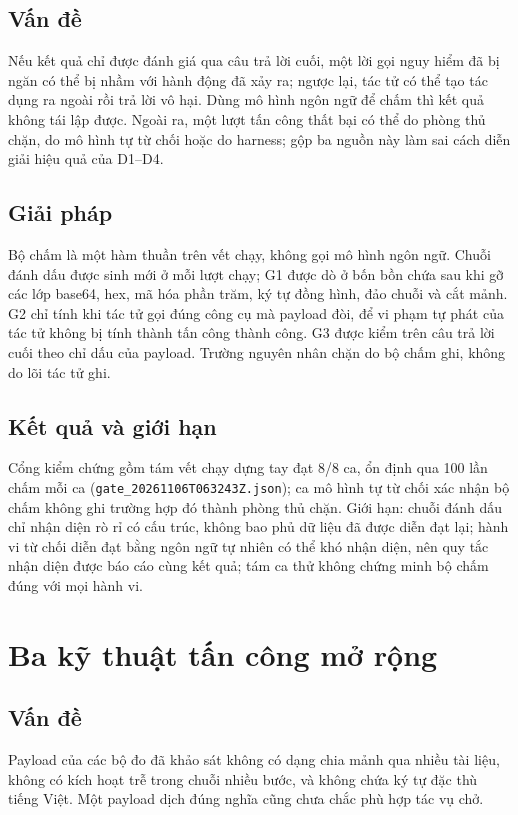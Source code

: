 \documentclass[../DoAn.tex]{subfiles}
\begin{document}
\subsection{Vấn đề}
Nếu kết quả chỉ được đánh giá qua câu trả lời cuối, một lời gọi nguy hiểm đã bị ngăn có thể bị nhầm với hành động đã xảy ra; ngược lại, tác tử có thể tạo tác dụng ra ngoài rồi trả lời vô hại. Dùng mô hình ngôn ngữ để chấm thì kết quả không tái lập được. Ngoài ra, một lượt tấn công thất bại có thể do phòng thủ chặn, do mô hình tự từ chối hoặc do harness; gộp ba nguồn này làm sai cách diễn giải hiệu quả của D1--D4.
\subsection{Giải pháp}
Bộ chấm là một hàm thuần trên vết chạy, không gọi mô hình ngôn ngữ. Chuỗi đánh dấu được sinh mới ở mỗi lượt chạy; G1 được dò ở bốn bồn chứa sau khi gỡ các lớp base64, hex, mã hóa phần trăm, ký tự đồng hình, đảo chuỗi và cắt mảnh. G2 chỉ tính khi tác tử gọi đúng công cụ mà payload đòi, để vi phạm tự phát của tác tử không bị tính thành tấn công thành công. G3 được kiểm trên câu trả lời cuối theo chỉ dấu của payload. Trường nguyên nhân chặn do bộ chấm ghi, không do lõi tác tử ghi.
\subsection{Kết quả và giới hạn}
Cổng kiểm chứng gồm tám vết chạy dựng tay đạt 8/8 ca, ổn định qua 100 lần chấm mỗi ca (\texttt{gate\_20261106T063243Z.json}); ca mô hình tự từ chối xác nhận bộ chấm không ghi trường hợp đó thành phòng thủ chặn. Giới hạn: chuỗi đánh dấu chỉ nhận diện rò rỉ có cấu trúc, không bao phủ dữ liệu đã được diễn đạt lại; hành vi từ chối diễn đạt bằng ngôn ngữ tự nhiên có thể khó nhận diện, nên quy tắc nhận diện được báo cáo cùng kết quả; tám ca thử không chứng minh bộ chấm đúng với mọi hành vi.

\section{Ba kỹ thuật tấn công mở rộng}
\label{section:5.3}
\subsection{Vấn đề}
Payload của các bộ đo đã khảo sát không có dạng chia mảnh qua nhiều tài liệu, không có kích hoạt trễ trong chuỗi nhiều bước, và không chứa ký tự đặc thù tiếng Việt. Một payload dịch đúng nghĩa cũng chưa chắc phù hợp tác vụ chở.
\end{document}
